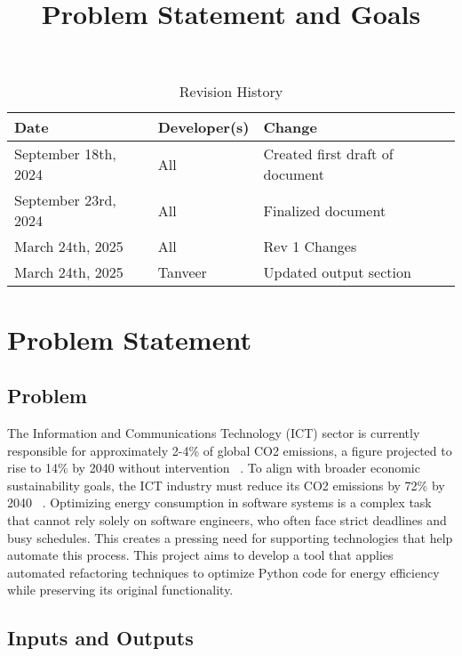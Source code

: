 \documentclass{article}
\title{Problem Statement and Goals\\\progname}
\author{\authname}
\date{}
\begin{document}
\maketitle

\begin{table}[hp]
  \caption{Revision History} \label{TblRevisionHistory}
  \begin{tabularx}{\textwidth}{llX}
    \toprule
    \textbf{Date} & \textbf{Developer(s)} & \textbf{Change}\\
    \midrule
    September 18th, 2024 & All & Created first draft of document\\
    September 23rd, 2024 & All & Finalized document\\
    March 24th, 2025 & All & Rev 1 Changes \\
    March 24th, 2025 & Tanveer & Updated output section \\
    \bottomrule
  \end{tabularx}
\end{table}

\newpage

\section{Problem Statement}

\subsection{Problem}

The Information and Communications Technology (ICT) sector is currently 
responsible for approximately 2-4\% of global CO2 emissions, a figure 
projected to rise to 14\% by 2040 without intervention ~\citep{BelkhirAndElmeligi2018}. 
To align with broader economic sustainability goals, 
the ICT industry must reduce its CO2 emissions by 72\% by 
2040 ~\citep{FreitagAndBernersLee2021}. Optimizing energy 
consumption in software systems is a complex task that cannot 
rely solely on software engineers, who often face strict deadlines 
and busy schedules. This creates a pressing need for supporting 
technologies that help automate this process. This project aims 
to develop a tool that applies automated refactoring techniques 
to optimize Python code for energy efficiency while preserving its 
original functionality. 

\subsection{Inputs and Outputs}
\end{document}
